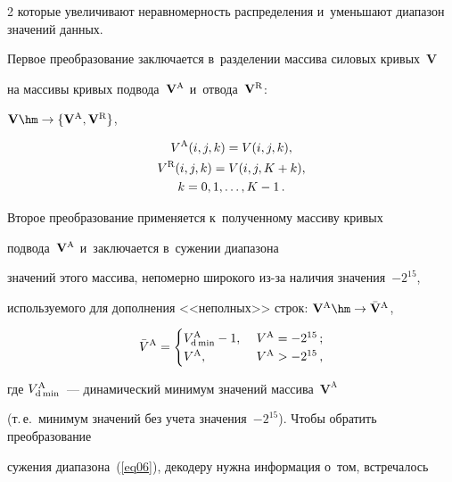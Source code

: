 \begin{multicols}{2}
которые увеличивают неравномерность распределения и~уменьшают диапазон значений данных.



Первое преобразование заключается в~разделении массива силовых кривых~$\mathbf{V}$ 

на массивы кривых подвода~$\mathbf{V}^{\text A}$ и~отвода~$\mathbf{V}^{\text R}$:  

$\mathbf{V}\hm\to\{\mathbf{V}^{\text A},\mathbf{V}^{\text R}\}$,

\begin{multline}

V^{\text A}(i,j,k) = V(i,j,k), \\

V^{\text R}(i,j,k) = V(i,j,K+k), \\

k = 0,1,\ldots,K-1\,.

\label{eq05}

\end{multline}



Второе преобразование применяется к~полученному массиву кривых 

подвода~$\mathbf{V}^{\text A}$ и~заключается в~сужении диапазона

 значений этого массива, непомерно широкого из-за наличия значения~$-2^{15}$, 

 используемого для дополнения <<неполных>> строк:  $\mathbf{V}^{\text A}\hm\to  \bar{\mathbf{V}}^{\text A}$,

\begin{equation}

\label{eq06}

\bar{V}^{\text A} = \begin{cases}

 V^{\text A}_{\text d\min} - 1, &\ V^{\text A}=-2^{15}\,;\\

 V^{\text A}, &\ V^{\text A}>-2^{15}\,,

\end{cases}

\end{equation}

где $V^{\text A}_{\text d\min}$~--- динамический минимум значений массива~$\mathbf{V}^\text{A}$ 

(т.\,е.\ минимум значений без учета значения~$-2^{15}$). Чтобы обратить преобразование 

сужения диапазона~(\ref{eq06}), декодеру нужна информация о~том, встречалось 


\end{multicols}
